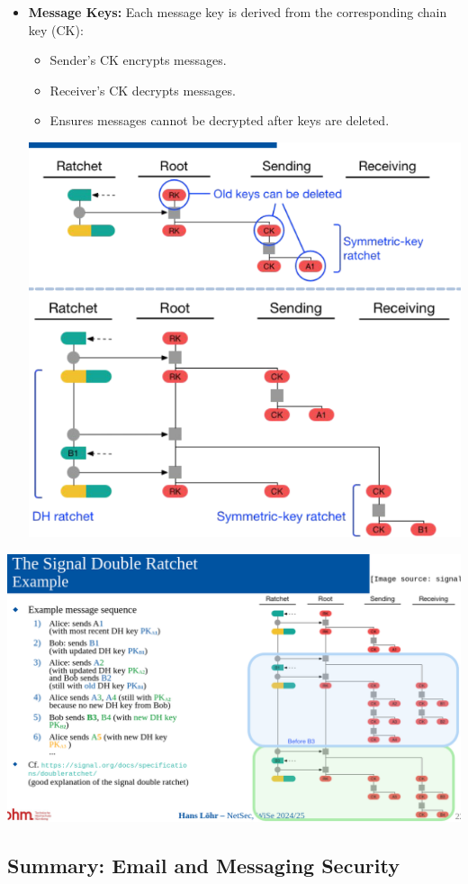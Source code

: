 \begin{itemize}
    \item \textbf{Message Keys:} Each message key is derived from the corresponding chain key (CK):
    \begin{itemize}
        \item Sender's CK encrypts messages.
        \item Receiver's CK decrypts messages.
        \item Ensures messages cannot be decrypted after keys are deleted.
    \end{itemize}
    \includegraphics[width=0.8\columnwidth]{Resources/signal_message_keys.png}
\end{itemize}

\includegraphics[width=.9\columnwidth]{Resources/signal_example.png}

\subsection{Summary: Email and Messaging Security}


